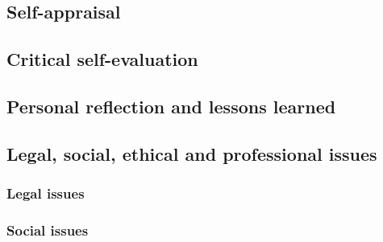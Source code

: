 \begin{appendices}

%
%
\chapter{Self-appraisal}


\section{Critical self-evaluation}


\section{Personal reflection and lessons learned}



\section{Legal, social, ethical and professional issues}


\subsection{Legal issues}

\subsection{Social issues}


\end{appendices}
